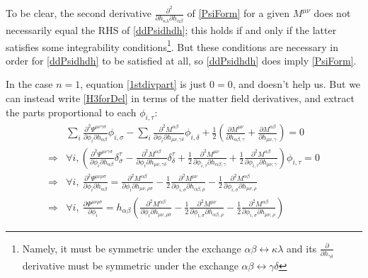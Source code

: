 \documentclass[aps,physrev,preprint,groupedaddress]{revtex4-2}
\begin{document}
To be clear, the second derivative \(\frac{\partial^2 }{\partial h_{\kappa\lambda}\partial h_{\alpha\beta}}\) of \eqref{PsiForm} for a given \(M^{\mu\nu}\) does not necessarily equal the RHS of \eqref{ddPsidhdh}; this holds if and only if the latter satisfies some integrability conditions\footnote{Namely, it must be symmetric under the exchange \(\alpha\beta\leftrightarrow\kappa\lambda\) and its \(\frac{\partial }{\partial h_{\gamma\delta}}\) derivative must be symmetric under the exchange \(\alpha\beta\leftrightarrow\gamma\delta\)}. But these conditions are necessary in order for \eqref{ddPsidhdh} to be satisfied at all, so \eqref{ddPsidhdh} does imply \eqref{PsiForm}.

In the case \(n=1\), equation \eqref{1stdivpart} is just \(0=0\), and doesn't help us. But we can instead write \eqref{H3forDel} in terms of the matter field derivatives, and extract the parts proportional to each \(\phi_{i,\tau}\):
\begin{equation}\label{n=1grad}
\begin{split}
&\sum_i \frac{\partial^2 \Psi^{\mu\nu\gamma\sigma}}{\partial \phi_i\partial h_{\alpha\beta}}\phi_{i,\sigma}-\sum_i\frac{\partial^2 M^{\alpha\beta}}{\partial\phi_i\partial h_{\mu\nu,\gamma\delta}}\phi_{i,\delta}+\frac{1}{2}\left(\frac{\partial M^{\mu\nu}}{\partial h_{\alpha\beta,\gamma}}+\frac{\partial M^{\alpha\beta}}{\partial h_{\mu\nu,\gamma}}\right)=0\\
\Rightarrow &\forall i, \left(\frac{\partial^2 \Psi^{\mu\nu\gamma\sigma}}{\partial \phi_i\partial h_{\alpha\beta}}\delta_\sigma^\tau-\frac{\partial^2 M^{\alpha\beta}}{\partial\phi_i\partial h_{\mu\nu,\gamma\delta}}\delta_\delta^\tau+\frac{1}{2}\frac{\partial^2 M^{\mu\nu}}{\partial\phi_{i,\tau} \partial h_{\alpha\beta,\gamma}}+\frac{1}{2}\frac{\partial^2 M^{\alpha\beta}}{\partial\phi_{i,\tau} \partial h_{\mu\nu,\gamma}}\right)\phi_{i,\tau}=0\\
\Rightarrow &\forall i,\  \frac{\partial^2 \Psi^{\mu\nu\rho\sigma}}{\partial \phi_i\partial h_{\alpha\beta}}=\frac{\partial^2 M^{\alpha\beta}}{\partial\phi_i\partial h_{\mu\nu,\rho\sigma}}-\frac{1}{2}\frac{\partial^2 M^{\mu\nu}}{\partial\phi_{i,\sigma} \partial h_{\alpha\beta,\rho}}-\frac{1}{2}\frac{\partial^2 M^{\alpha\beta}}{\partial\phi_{i,\sigma} \partial h_{\mu\nu,\rho}}\\
\Rightarrow&\forall i,\  \frac{\partial \Psi^{\mu\nu\rho\sigma}}{\partial \phi_i}=h_{\alpha\beta}\left(\frac{\partial^2 M^{\alpha\beta}}{\partial\phi_i\partial h_{\mu\nu,\rho\sigma}}-\frac{1}{2}\frac{\partial^2 M^{\mu\nu}}{\partial\phi_{i,\sigma} \partial h_{\alpha\beta,\rho}}-\frac{1}{2}\frac{\partial^2 M^{\alpha\beta}}{\partial\phi_{i,\sigma} \partial h_{\mu\nu,\rho}}\right)
\end{split}
\end{equation}
\end{document}
